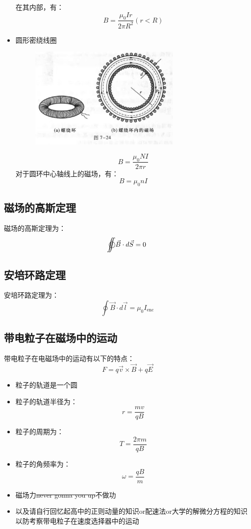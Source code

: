 \documentclass{ctexart}
\def\ooint{{\bigcirc}\kern-12.5pt{\int}\kern-7.5pt{\int}}
\begin{document}
\begin{itemize}
\begin{figure}[H]
    \end{figure}
    在其内部，有：
    $$
        B = \frac{\mu_0 Ir}{2\pi R^2} (r<R)
    $$
    \item 圆形密绕线圈
    \begin{figure}[H]
        \centering
        \includegraphics[width=0.7\textwidth]{img/7-24.jpg}
    \end{figure}
    $$
        B = \frac{\mu_0 N I}{2\pi r}
    $$
    对于圆环中心轴线上的磁场，有：
    $$
        B = \mu_0 n I
    $$
\end{itemize}
\subsection{磁场的高斯定理}
磁场的高斯定理为：
$$
    \ooint \vec{B} \cdot d\vec{S} = 0
$$
\subsection{安培环路定理}
安培环路定理为：
$$
    \oint \vec{B} \cdot d\vec{l} = \mu_0 I_{\text{enc}}
$$
\subsection{带电粒子在磁场中的运动}
带电粒子在电磁场中的运动有以下的特点：
$$
    F = q\vec{v} \times \vec{B} + q \vec{E}
$$
\begin{itemize}
    \item 粒子的轨道是一个圆
    \item 粒子的轨道半径为：
    $$
        r = \frac{mv}{qB}
    $$
    \item 粒子的周期为：
    $$
        T = \frac{2\pi m}{qB}
    $$
    \item 粒子的角频率为：
    $$
        \omega = \frac{qB}{m}
    $$
    \item 磁场力\sout{never gonna you up}不做功
    \item 以及请自行回忆起高中的正则动量的知识or配速法or大学的解微分方程的知识 以防考察带电粒子在速度选择器中的运动
\end{itemize}
\end{document}

